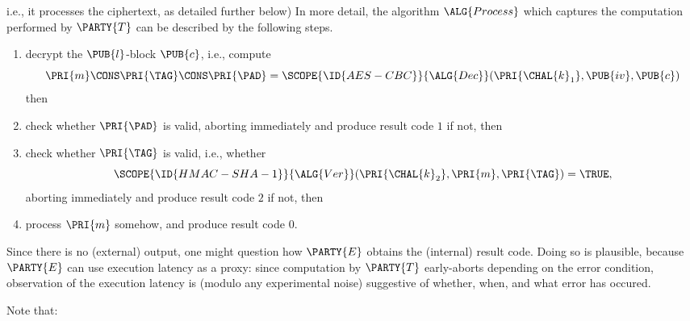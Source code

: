 {i.e., it processes the ciphertext, as detailed further below)
{} %
In more detail, the algorithm
$\ALG{Process}$
which captures the computation performed by
$\PARTY{T}$
can be described by the following steps.

\begin{enumerate}
\item decrypt the $\PUB{l}$-block $\PUB{c}$, i.e., compute
      \[
      \PRI{m} \CONS \PRI{\TAG} \CONS \PRI{\PAD} = \SCOPE{\ID{AES-CBC}}{\ALG{Dec}}( \PRI{\CHAL{k}_1}, \PUB{iv}, \PUB{c} )
      \]
      then
\item check whether $\PRI{\PAD}$ is valid, 
      aborting immediately  and produce result code $1$ if not,
      then
\item check whether $\PRI{\TAG}$ is valid, i.e., whether 
      \[
      \SCOPE{\ID{HMAC-SHA-1}}{\ALG{Ver}}( \PRI{\CHAL{k}_2}, \PRI{m}, \PRI{\TAG} ) = \TRUE ,
      \]
      aborting immediately  and produce result code $2$ if not,
      then
\item process $\PRI{m}$ somehow,
                            and produce result code $0$.
\end{enumerate}

\noindent
Since there is no (external) output, one might question how
$\PARTY{E}$
obtains the (internal) result code.  Doing so is plausible, because 
$\PARTY{E}$
can use execution latency as a proxy: since computation by
$\PARTY{T}$
early-aborts depending on the error condition, observation of the execution
latency is (modulo any experimental noise) suggestive of whether, when, and 
what error has occured.




%
Note that:

}
